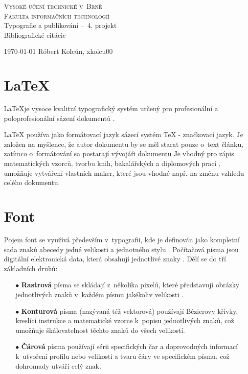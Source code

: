 \documentclass[11pt,a4paper]{article}
\begin{document}
	\begin{titlepage}
		\begin{center}
			\Huge
			\textsc{\Huge Vysoké učení technické v~Brně \\ {\huge Fakulta informačních technologií \\}}
			{\LARGE Typografie a publikování --\ 4. projekt} \\ {\Huge Bibliografické citácie}
		\end{center}
		{\Large \today \hfill
			Róbert Kolcún, xkolcu00}
	\end{titlepage}
	
	
	\section{\LaTeX}
	
		\LaTeX je vysoce kvalitní typografický systém určený pro profesionální a poloprofesionální sázení dokumentů \cite{odkaz:Martinek}.
		
		LaTeX používa jako formátovací jazyk sázecí systém TeX - značkovací jazyk. Je založen na myšlence, že autor dokumentu by se měl starat pouze o~text článku, zatímco o~formátování sa postarají vývojáŕi dokumentu \cite{kniha:Rybicka} Je vhodný pro zápis matematických vzorců, tvorbu knih, bakalářských \cite{bakalarka:Korekce} a diplomových prací \cite{diplomovka:Znakovesady}, umožňuje vytváŕení vlastních maker, které jsou vhodné např. na změnu vzhledu celého dokumentu.
	
	\section{Font}
	
		Pojem font se využívá především v~typografii, kde je definován jako kompletní sada znaků abecedy jedné velikosti a jednotného stylu \cite{prop:Computing}.
		Počítačová písma jsou digitální elektronická data, která obsahují jednotlivé znaky \cite{kniha:Friedl}. Dělí se do tří základních druhů:
	
		\begin{enumerate}
			\item[$\bullet$] \textbf{Rastrová} písma se skládají z~několika pixelů, které představují obrázky jednotlivých znaků v~každém písmu jakékoliv velikosti \cite{odkaz:Microsoft}.
			\item[$\bullet$] \textbf{Konturová} písma (nazývaná též vektorová) používají Bézierovy křivky, kreslící instrukce a matematické vzorce k~popisu jednotlivých znaků, což umožňuje škálovatelnost těchto znaků do všech velikostí.
			\item[$\bullet$] \textbf{Čárová} písma používají sérii specifických čar a doprovodných informací k~utvoření profilu nebo velikosti a tvaru čáry ve specifickém písmu, což dohromady utváří celý znak.
		\end{enumerate}
	
\end{document}
